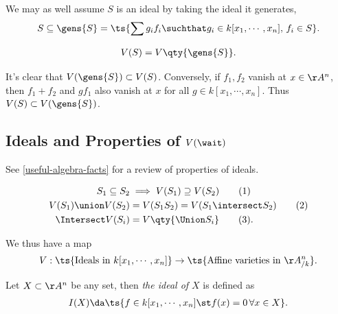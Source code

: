 \begin{remark}

We may as well assume \(S\) is an ideal by taking the ideal it
generates,
\begin{align*}
S\subseteq \gens{S} = \ts{\sum g_i f_i \suchthat g_i \in k[x_1, \cdots, x_n],\, f_i\in S}
.\end{align*}

\begin{claim}

\begin{align*}  
V(S) = V\qty{\gens{S}}
.\end{align*}

\end{claim}

It's clear that \(V(\gens{S}) \subset V(S)\). Conversely, if
\(f_1, f_2\) vanish at \(x\in \AA^n\), then \(f_1 + f_2\) and \(gf_1\)
also vanish at \(x\) for all \(g\in k[x_1, \cdots, x_n]\). Thus
\(V(S) \subset V(\gens{S})\).

\end{remark}

\hypertarget{ideals-and-properties-of-vwait}{%
\subsection{\texorpdfstring{Ideals and Properties of
\(V(\wait)\)}{Ideals and Properties of V(\textbackslash wait)}}\label{ideals-and-properties-of-vwait}}

See \cref{useful-algebra-facts} for a review of properties of ideals.

\begin{proposition}[Properties of $V$]

\begin{align*}  
S_1 \subseteq S_2 &\implies V(S_1) \supseteq V(S_2) \tag{1}\\
V(S_1) \union V(S_2) &= V(S_1 S_2) = V(S_1 \intersect S_2) \tag{2} \\
\Intersect V(S_i) &= V\qty{\Union  S_i} \tag{3}
.\end{align*}

\end{proposition}

We thus have a map
\begin{align*}  
V: \ts{\text{Ideals in } k[x_1, \cdots, x_n]} \to \ts{\text{Affine varieties in } \AA^n_{/k}}
.\end{align*}

\begin{definition}

Let \(X\subset \AA^n\) be any set, then \emph{the ideal of \(X\)} is
defined as
\begin{align*}  
I(X) \da\ts{f\in k[x_1, \cdots, x_n] \st f(x) = 0\, \forall x\in X}
.\end{align*}

\end{definition}

